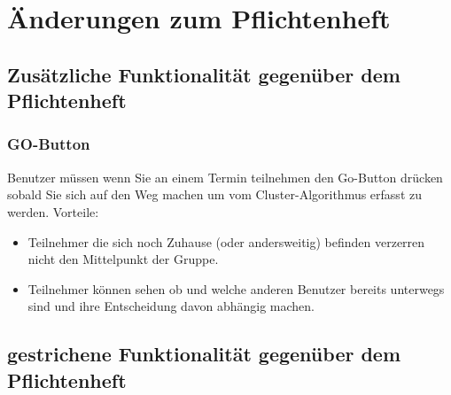 \section{Änderungen zum Pflichtenheft}
	\subsection{Zusätzliche Funktionalität gegenüber dem Pflichtenheft}
	\subsubsection{GO-Button}
		Benutzer müssen wenn Sie an einem Termin teilnehmen den Go-Button drücken sobald Sie sich auf den Weg machen um vom Cluster-Algorithmus erfasst zu werden. 
		\newline
		Vorteile:
		\begin{itemize}
		\item Teilnehmer die sich noch Zuhause (oder andersweitig) befinden verzerren nicht den Mittelpunkt der Gruppe.
		\item Teilnehmer können sehen ob und welche anderen Benutzer bereits unterwegs sind und ihre Entscheidung davon abhängig machen.
		\end{itemize}
	\subsection{gestrichene Funktionalität gegenüber dem Pflichtenheft}
	\newpage